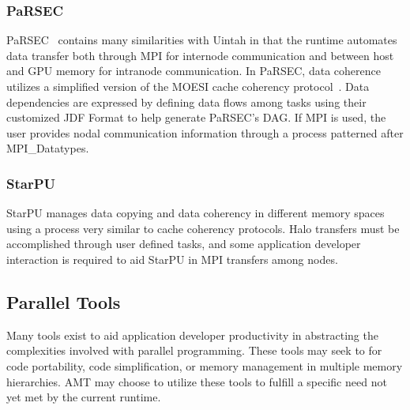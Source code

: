 \documentclass[12pt]{article}
\begin{document}
\subsubsection{PaRSEC}
\label{ch:PaRSEC}
PaRSEC~\cite{parsec2012} contains many similarities with Uintah in that the runtime automates data transfer both through MPI for internode communication and between host and GPU memory for intranode communication.  In PaRSEC, data coherence utilizes a simplified version of the MOESI cache coherency protocol~\cite{parsec-coherency}.  Data dependencies are expressed by defining data flows among tasks using their customized JDF Format to help generate PaRSEC's DAG.  If MPI is used, the user provides nodal communication information through a process patterned after MPI\_Datatypes. 

\subsubsection{StarPU}
\label{ch:StarPU}
StarPU \cite{starpu} manages data copying and data coherency in different memory spaces using a process very similar to cache coherency protocols.  Halo transfers must be accomplished through user defined tasks, and some application developer interaction is required to aid StarPU in MPI transfers among nodes.  

\subsection{Parallel Tools}
\label{ch:parallel_tools}

Many tools exist to aid application developer productivity in abstracting the complexities involved with parallel programming.  These tools may seek to for code portability, code simplification, or memory management in multiple memory hierarchies.  AMT may choose to utilize these tools to fulfill a specific need not yet met by the current runtime. 
\end{document}
